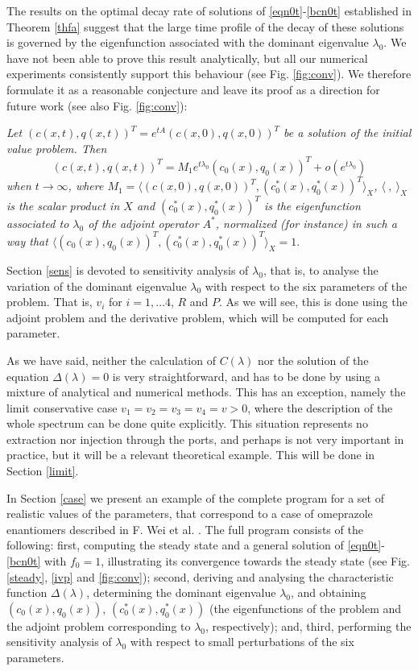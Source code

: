 \documentclass[a4paper]{article}
\numberwithin{equation}{section}
\begin{document}
The results on the optimal decay rate of solutions of \eqref{eqn0t}-\eqref{bcn0t} established in Theorem \ref{thfa} suggest that the large time profile of the decay of these solutions is governed by the eigenfunction associated with the dominant eigenvalue $\lambda_0$.
We have not been able to prove this result analytically, but all our numerical experiments consistently support this behaviour (see Fig. \ref{fig:conv}). We therefore formulate it as a reasonable conjecture and leave its proof as a direction for future work (see also Fig. \ref{fig:conv}):

\textit{Let $(c(x,t),q(x,t))^T=e^{tA}(c(x,0),q(x,0))^T$ be a solution of the initial value problem. Then
\begin{equation}\label{conj}
(c(x,t),q(x,t))^T= M_1
e^{t\lambda_0}(c_0(x),q_0(x))^T+o(e^{t\lambda_0})
\end{equation}
when $t\to\infty$, where $M_1=\langle (c(x,0),q(x,0))^T, (c^*_0(x),q^*_0(x))^T\rangle_X$, $\langle\ ,\ \rangle_X$ is the scalar product in $X$ and
$(c^*_0(x),q^*_0(x))^T$ is the eigenfunction associated to $\lambda_0$ of the adjoint operator $A^*$, normalized (for instance) in such a way that
$\langle (c_0(x),q_0(x))^T, (c^*_0(x),q^*_0(x))^T\rangle_X=1.$
}

Section \ref{sens} is devoted to sensitivity analysis of $\lambda_0$, that is, to analyse the variation of the dominant eigenvalue $\lambda_0$ with respect to the six parameters of the problem. That is, $v_i$ for $i=1,\ldots 4$, $R$ and $P$. As we will see, this is done using the adjoint problem and the derivative problem, which will be computed for each parameter.

As we have said, neither the calculation of $C(\lambda)$ nor the solution of the equation $\Delta(\lambda)=0$ is very straightforward, and has to be done by using a mixture of analytical and numerical methods. This has an exception, namely the limit conservative case $v_1=v_2=v_3=v_4=v>0$, where the description of the whole spectrum can be done quite explicitly. This situation represents no extraction nor injection through the ports, and perhaps is not very important in practice, but it will be a relevant theoretical example. This will be done in Section \ref{limit}.

In Section \ref{case} we present an example of the complete program for a set of realistic values of the parameters, that correspond to a case of omeprazole enantiomers described in F. Wei et al. \cite{Wei}. The full program consists of the following: first, computing the steady state and a general solution of \eqref{eqn0t}-\eqref{bcn0t} with $f_0=1$, illustrating its convergence towards the steady state (see Fig. \ref{steady}, \ref{ivp} and \ref{fig:conv}); second, deriving and analysing the characteristic function $\Delta(\lambda)$, determining the dominant eigenvalue $\lambda_0$, and obtaining $(c_0(x), q_0(x))$, $(c_0^*(x), q_0^*(x))$ (the eigenfunctions of the problem and the adjoint problem corresponding to $\lambda_0$, respectively); and, third, performing the sensitivity analysis of $\lambda_0$ with respect to small perturbations of the six parameters.
\end{document}

